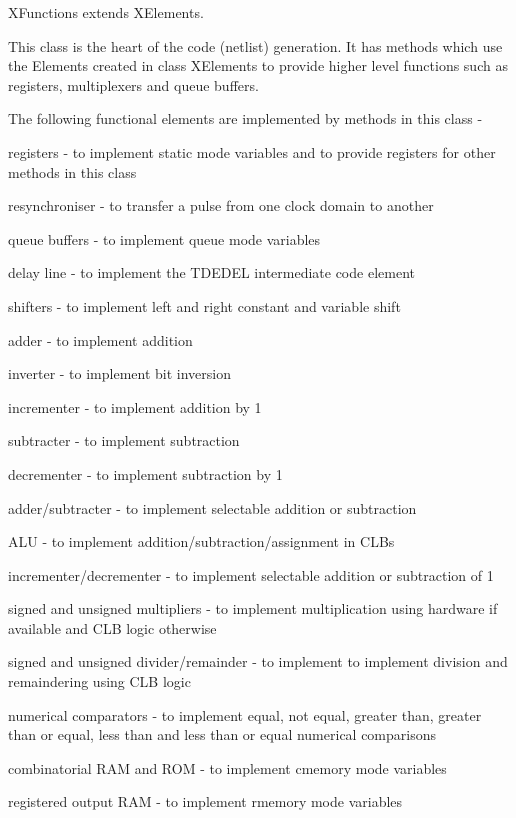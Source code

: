 XFunctions extends XElements.

This class is the heart of the code (netlist) generation. It has methods
which use the Elements created in class XElements to provide higher
level functions such as registers, multiplexers and queue buffers.

The following functional elements are implemented by methods
in this class -

\blist
\item   registers - to implement static mode variables and to provide
        registers for other methods in this class
\item   resynchroniser - to transfer a pulse from one clock domain to
        another
\item   queue buffers - to implement queue mode variables
\item   delay line - to implement the TDEDEL intermediate code element
\item   shifters - to implement left and right constant and variable
        shift
\item   adder - to implement addition
\item   inverter - to implement bit inversion
\item   incrementer - to implement addition by 1
\item   subtracter - to implement subtraction
\item   decrementer - to implement subtraction by 1
\item   adder/subtracter - to implement selectable addition or
        subtraction
\item   ALU - to implement addition/subtraction/assignment in CLBs
\item   incrementer/decrementer - to implement selectable addition or
        subtraction of 1
\item   signed and unsigned multipliers - to implement multiplication
        using hardware if available and CLB logic otherwise
\item   signed and unsigned divider/remainder - to implement to
        implement division and remaindering using CLB logic
\item   numerical comparators - to implement equal, not equal,
        greater than, greater than or equal, less than and less than or
        equal numerical comparisons
\item   combinatorial RAM and ROM - to implement cmemory mode variables
\item   registered output RAM - to implement rmemory mode variables
\blend

